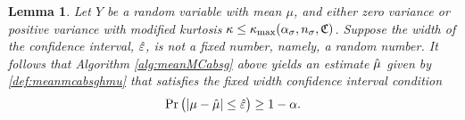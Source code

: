 \documentclass{iitthesis}
\newtheorem{lemma}[theorem]{Lemma}
\begin{document}
\begin{lemma}\label{thm:fixedwidthrandomeps}
Let $Y$ be a random variable with mean $\mu$, and either zero variance or positive variance with modified kurtosis $\kappa \leq \kappa_{\max}(\alpha_\sigma, n_\sigma, \mathfrak{C})$. Suppose the width of the confidence interval, $\hat{\varepsilon}$, is not a fixed number, namely, a random number. It follows that Algorithm \ref{alg:meanMCabsg} above yields an estimate $\hat{\mu}$ given by \eqref{def:meanmcabsghmu} that satisfies the fixed width confidence interval condition
\begin{align}
\Pr\left( \left \lvert \mu-\hat{\mu} \right \rvert \leq \hat{\varepsilon} \right) \geq 1-\alpha.
\end{align}
\end{lemma}
\end{document}
